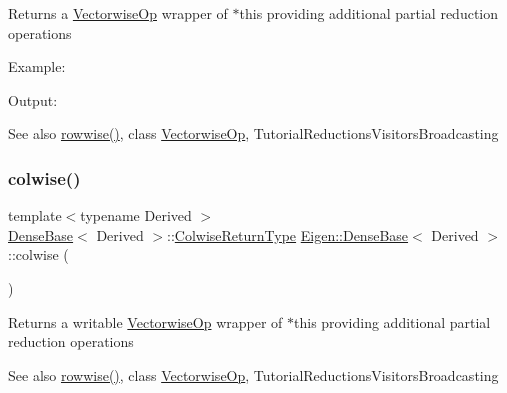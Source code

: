 \begin{DoxyReturn}{Returns}
a \mbox{\hyperlink{class_eigen_1_1_vectorwise_op}{Vectorwise\+Op}} wrapper of $\ast$this providing additional partial reduction operations
\end{DoxyReturn}
Example\+: 
\begin{DoxyCodeInclude}{0}
\end{DoxyCodeInclude}
 Output\+: 
\begin{DoxyVerbInclude}
\end{DoxyVerbInclude}


\begin{DoxySeeAlso}{See also}
\mbox{\hyperlink{class_eigen_1_1_dense_base_a6daa3a3156ca0e0722bf78638e1c7f28}{rowwise()}}, class \mbox{\hyperlink{class_eigen_1_1_vectorwise_op}{Vectorwise\+Op}}, Tutorial\+Reductions\+Visitors\+Broadcasting 
\end{DoxySeeAlso}
\mbox{\label{class_eigen_1_1_dense_base_a1c0e1b6067ec1de6cb8799da55aa7d30}} 
\subsubsection{\texorpdfstring{colwise()}{colwise()}\hspace{0.1cm}{\footnotesize\ttfamily [2/2]}}
{\footnotesize\ttfamily template$<$typename Derived $>$ \\
\mbox{\hyperlink{class_eigen_1_1_dense_base}{Dense\+Base}}$<$ Derived $>$\+::\mbox{\hyperlink{class_eigen_1_1_vectorwise_op}{Colwise\+Return\+Type}} \mbox{\hyperlink{class_eigen_1_1_dense_base}{Eigen\+::\+Dense\+Base}}$<$ Derived $>$\+::colwise (\begin{DoxyParamCaption}{ }\end{DoxyParamCaption})\hspace{0.3cm}{\ttfamily [inline]}}

\begin{DoxyReturn}{Returns}
a writable \mbox{\hyperlink{class_eigen_1_1_vectorwise_op}{Vectorwise\+Op}} wrapper of $\ast$this providing additional partial reduction operations
\end{DoxyReturn}
\begin{DoxySeeAlso}{See also}
\mbox{\hyperlink{class_eigen_1_1_dense_base_a6daa3a3156ca0e0722bf78638e1c7f28}{rowwise()}}, class \mbox{\hyperlink{class_eigen_1_1_vectorwise_op}{Vectorwise\+Op}}, Tutorial\+Reductions\+Visitors\+Broadcasting 
\end{DoxySeeAlso}
\mbox{\label{class_eigen_1_1_dense_base_ab0ae1bfa72faedcaf53af81ca76c446b}} 
